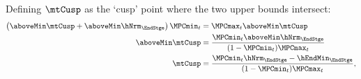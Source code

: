   Defining $\mtCusp$ as the `cusp' point where the two upper bounds
  intersect:
  \begin{equation*}\begin{gathered}\begin{aligned}
        \left(\aboveMin \mtCusp+\aboveMin \hNrm_{\EndStge}\right)\MPCmin_{t}  & =  \MPCmax_{t} \aboveMin \mtCusp \\
        \aboveMin \mtCusp  & =  \frac{\MPCmin_{t}\aboveMin \hNrm_{\EndStge}}{(1-\MPCmin_{t})\MPCmax_{t}} \\
        \mtCusp  & =  \frac{\MPCmin_{t}\hNrm_{\EndStge}-\hEndMin_{\EndStge}}{(1-\MPCmin_{t})\MPCmax_{t}},
      \end{aligned}\end{gathered}\end{equation*}
